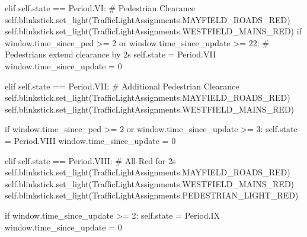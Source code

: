 \documentclass[
  letterpaper,
  DIV=11,
  numbers=noendperiod]{scrartcl}
\newenvironment{Shaded}{\begin{snugshade}}{\end{snugshade}}
\newcommand{\CommentTok}[1]{\textcolor[rgb]{0.37,0.37,0.37}{#1}}
\newcommand{\ControlFlowTok}[1]{\textcolor[rgb]{0.00,0.23,0.31}{#1}}
\newcommand{\DecValTok}[1]{\textcolor[rgb]{0.68,0.00,0.00}{#1}}
\newcommand{\KeywordTok}[1]{\textcolor[rgb]{0.00,0.23,0.31}{#1}}
\newcommand{\NormalTok}[1]{\textcolor[rgb]{0.00,0.23,0.31}{#1}}
\newcommand{\OperatorTok}[1]{\textcolor[rgb]{0.37,0.37,0.37}{#1}}
\newcommand{\VariableTok}[1]{\textcolor[rgb]{0.07,0.07,0.07}{#1}}
\begin{document}
\begin{Shaded}
\begin{Highlighting}[]
        \ControlFlowTok{elif} \VariableTok{self}\NormalTok{.state }\OperatorTok{==}\NormalTok{ Period.VI:}
            \CommentTok{\# Pedestrian Clearance}
            \VariableTok{self}\NormalTok{.blinkstick.set\_light(TrafficLightAssignments.MAYFIELD\_ROADS\_RED)}
            \VariableTok{self}\NormalTok{.blinkstick.set\_light(TrafficLightAssignments.WESTFIELD\_MAINS\_RED)}
            \ControlFlowTok{if}\NormalTok{ window.time\_since\_ped }\OperatorTok{\textgreater{}=} \DecValTok{2} \KeywordTok{or}\NormalTok{ window.time\_since\_update }\OperatorTok{\textgreater{}=} \DecValTok{22}\NormalTok{:}
                \CommentTok{\# Pedestrians extend clearance by 2s}
                \VariableTok{self}\NormalTok{.state }\OperatorTok{=}\NormalTok{ Period.VII}
\NormalTok{                window.time\_since\_update }\OperatorTok{=} \DecValTok{0}

        \ControlFlowTok{elif} \VariableTok{self}\NormalTok{.state }\OperatorTok{==}\NormalTok{ Period.VII:}
            \CommentTok{\# Additional Pedestrian Clearance}
            \VariableTok{self}\NormalTok{.blinkstick.set\_light(TrafficLightAssignments.MAYFIELD\_ROADS\_RED)}
            \VariableTok{self}\NormalTok{.blinkstick.set\_light(TrafficLightAssignments.WESTFIELD\_MAINS\_RED)}
                    
            \ControlFlowTok{if}\NormalTok{ window.time\_since\_ped }\OperatorTok{\textgreater{}=} \DecValTok{2} \KeywordTok{or}\NormalTok{ window.time\_since\_update }\OperatorTok{\textgreater{}=} \DecValTok{3}\NormalTok{:}
                \VariableTok{self}\NormalTok{.state }\OperatorTok{=}\NormalTok{ Period.VIII}
\NormalTok{                window.time\_since\_update }\OperatorTok{=} \DecValTok{0}


        \ControlFlowTok{elif} \VariableTok{self}\NormalTok{.state }\OperatorTok{==}\NormalTok{ Period.VIII:}
            \CommentTok{\# All{-}Red for 2s}
            \VariableTok{self}\NormalTok{.blinkstick.set\_light(TrafficLightAssignments.MAYFIELD\_ROADS\_RED)}
            \VariableTok{self}\NormalTok{.blinkstick.set\_light(TrafficLightAssignments.WESTFIELD\_MAINS\_RED)}
            \VariableTok{self}\NormalTok{.blinkstick.set\_light(TrafficLightAssignments.PEDESTRIAN\_LIGHT\_RED)}
            
            \ControlFlowTok{if}\NormalTok{ window.time\_since\_update }\OperatorTok{\textgreater{}=} \DecValTok{2}\NormalTok{:}
                \VariableTok{self}\NormalTok{.state }\OperatorTok{=}\NormalTok{ Period.IX}
\NormalTok{                window.time\_since\_update }\OperatorTok{=} \DecValTok{0}


\end{Highlighting}
\end{Shaded}
\end{document}
